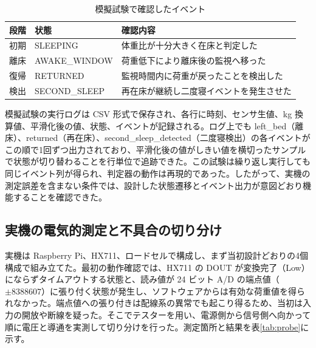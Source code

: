 \documentclass[paper=a4,fontsize=10pt,ja=standard,lualatex]{jlreq}
\begin{document}
\begin{table}[h]
\centering
\caption{模擬試験で確認したイベント}
\label{tab:events}
\begin{tabularx}{0.95\linewidth}{lYY}
\toprule
段階 & 状態 & 確認内容\\
\midrule
初期 & SLEEPING & 体重比が十分大きく在床と判定した\\
離床 & AWAKE\_WINDOW & 荷重低下により離床後の監視へ移った\\
復帰 & RETURNED & 監視時間内に荷重が戻ったことを検出した\\
検出 & SECOND\_SLEEP & 再在床が継続し二度寝イベントを発生させた\\
\bottomrule
\end{tabularx}
\end{table}

模擬試験の実行ログは CSV 形式で保存され、各行に時刻、センサ生値、kg 換算値、平滑化後の値、状態、イベントが記録される。ログ上でも left\_bed（離床）、returned（再在床）、second\_sleep\_detected（二度寝検出）の各イベントがこの順で1回ずつ出力されており、平滑化後の値がしきい値を横切ったサンプルで状態が切り替わることを行単位で追跡できた。この試験は繰り返し実行しても同じイベント列が得られ、判定器の動作は再現的であった。したがって、実機の測定誤差を含まない条件では、設計した状態遷移とイベント出力が意図どおり機能することを確認できた。

\subsection{実機の電気的測定と不具合の切り分け}

実機は Raspberry Pi、HX711、ロードセルで構成し、まず当初設計どおりの4個構成で組み立てた。最初の動作確認では、HX711 の DOUT が変換完了（Low）にならずタイムアウトする状態と、読み値が 24 ビット A/D の端点値（$\pm 8388607$）に張り付く状態が発生し、ソフトウェアからは有効な荷重値を得られなかった。端点値への張り付きは配線系の異常でも起こり得るため、当初は入力の開放や断線を疑った。そこでテスターを用い、電源側から信号側へ向かって順に電圧と導通を実測して切り分けを行った。測定箇所と結果を表\ref{tab:probe}に示す。
\end{document}
